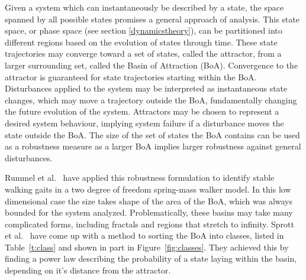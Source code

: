 Given a system which can instantaneously be described by a state, the space spanned by all possible states promises a general approach of analysis. This state space, or phase space (see section \ref{dynamicstheory}), can be partitioned into different regions based on the evolution of states through time. These state trajectories may converge toward a set of states, called the attractor, from a larger surrounding set, called the Basin of Attraction (BoA). Convergence to the attractor is guaranteed for state trajectories starting within the BoA. Disturbances applied to the system may be interpreted as instantaneous state changes, which may move a trajectory outside the BoA, fundamentally changing the future evolution of the system. Attractors may be chosen to represent a desired system behaviour, implying system failure if a disturbance moves the state outside the BoA. The size of the set of states the BoA contains can be used as a robustness measure as a larger BoA implies larger robustness against general disturbances. 

Rummel et al.\ \cite{walkbasin} have applied this robustness formulation to identify stable walking gaits in a two degree of freedom spring-mass walker model. In this low dimensional case the size takes shape of the area of the BoA, which was always bounded for the system analyzed. Problematically, these basins may take many complicated forms, including fractals and regions that stretch to infinity. Sprott et al.\ \cite{classify} have come up with a method to sorting the BoA into classes, listed in Table~\ref{t:class} and shown in part in Figure~\ref{fig:classes}. They achieved this by finding a power law describing the probability of a state laying within the basin, depending on it's distance from the attractor. 

